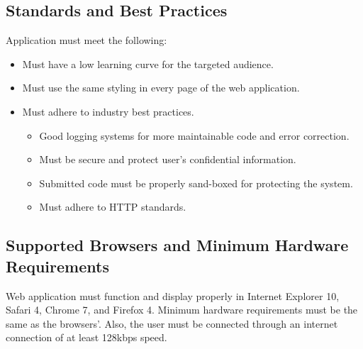 \label{sec:stand}
\subsection{Standards and Best Practices}

Application must meet the following:

\begin{itemize}
\item Must have a low learning curve for the targeted audience.
\item Must use the same styling in every page of the web application.
\item Must adhere to industry best practices.
\begin{itemize}
\item Good logging systems for more maintainable code and error correction.
\item Must be secure and protect user's confidential information.
\item Submitted code must be properly sand-boxed for protecting the system.
\item Must adhere to HTTP standards.
\end{itemize}
\end{itemize}

\subsection{Supported Browsers and Minimum Hardware Requirements}

Web application must function and display properly in Internet Explorer 10, 
Safari 4, Chrome 7, and Firefox 4. Minimum hardware requirements must be the same as the browsers'. Also, the user must be connected through an internet connection of at least 128kbps speed.